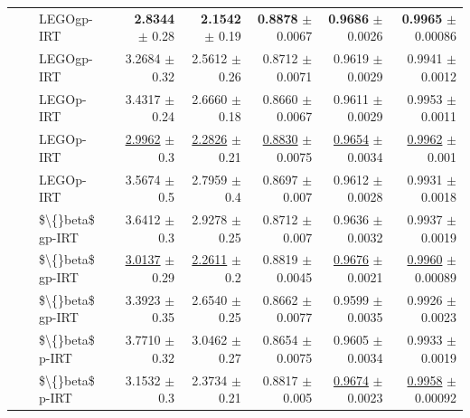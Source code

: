 \begin{longtable}{llp{}rrrrr}
 &  & LEGOgp-IRT & \textbf{2.8344} {\scriptsize $\pm$ 0.28} & \textbf{2.1542} {\scriptsize $\pm$ 0.19} & \textbf{0.8878} {\scriptsize $\pm$ 0.0067} & \textbf{0.9686} {\scriptsize $\pm$ 0.0026} & \textbf{0.9965} {\scriptsize $\pm$ 0.00086} \\
 &  & LEGOgp-IRT & 3.2684 {\scriptsize $\pm$ 0.32} & 2.5612 {\scriptsize $\pm$ 0.26} & 0.8712 {\scriptsize $\pm$ 0.0071} & 0.9619 {\scriptsize $\pm$ 0.0029} & 0.9941 {\scriptsize $\pm$ 0.0012} \\
 &  & LEGOp-IRT & 3.4317 {\scriptsize $\pm$ 0.24} & 2.6660 {\scriptsize $\pm$ 0.18} & 0.8660 {\scriptsize $\pm$ 0.0067} & 0.9611 {\scriptsize $\pm$ 0.0029} & 0.9953 {\scriptsize $\pm$ 0.0011} \\
 &  & LEGOp-IRT & \underline{2.9962} {\scriptsize $\pm$ 0.3} & \underline{2.2826} {\scriptsize $\pm$ 0.21} & \underline{0.8830} {\scriptsize $\pm$ 0.0075} & \underline{0.9654} {\scriptsize $\pm$ 0.0034} & \underline{0.9962} {\scriptsize $\pm$ 0.001} \\
 &  & LEGOp-IRT & 3.5674 {\scriptsize $\pm$ 0.5} & 2.7959 {\scriptsize $\pm$ 0.4} & 0.8697 {\scriptsize $\pm$ 0.007} & 0.9612 {\scriptsize $\pm$ 0.0028} & 0.9931 {\scriptsize $\pm$ 0.0018} \\
 &  & \$\textbackslash\{\}beta\$ gp-IRT & 3.6412 {\scriptsize $\pm$ 0.3} & 2.9278 {\scriptsize $\pm$ 0.25} & 0.8712 {\scriptsize $\pm$ 0.007} & 0.9636 {\scriptsize $\pm$ 0.0032} & 0.9937 {\scriptsize $\pm$ 0.0019} \\
 &  & \$\textbackslash\{\}beta\$ gp-IRT & \underline{3.0137} {\scriptsize $\pm$ 0.29} & \underline{2.2611} {\scriptsize $\pm$ 0.2} & 0.8819 {\scriptsize $\pm$ 0.0045} & \underline{0.9676} {\scriptsize $\pm$ 0.0021} & \underline{0.9960} {\scriptsize $\pm$ 0.00089} \\
 &  & \$\textbackslash\{\}beta\$ gp-IRT & 3.3923 {\scriptsize $\pm$ 0.35} & 2.6540 {\scriptsize $\pm$ 0.25} & 0.8662 {\scriptsize $\pm$ 0.0077} & 0.9599 {\scriptsize $\pm$ 0.0035} & 0.9926 {\scriptsize $\pm$ 0.0023} \\
 &  & \$\textbackslash\{\}beta\$ p-IRT & 3.7710 {\scriptsize $\pm$ 0.32} & 3.0462 {\scriptsize $\pm$ 0.27} & 0.8654 {\scriptsize $\pm$ 0.0075} & 0.9605 {\scriptsize $\pm$ 0.0034} & 0.9933 {\scriptsize $\pm$ 0.0019} \\
 &  & \$\textbackslash\{\}beta\$ p-IRT & 3.1532 {\scriptsize $\pm$ 0.3} & 2.3734 {\scriptsize $\pm$ 0.21} & 0.8817 {\scriptsize $\pm$ 0.005} & \underline{0.9674} {\scriptsize $\pm$ 0.0023} & \underline{0.9958} {\scriptsize $\pm$ 0.00092} \\

\end{longtable}
